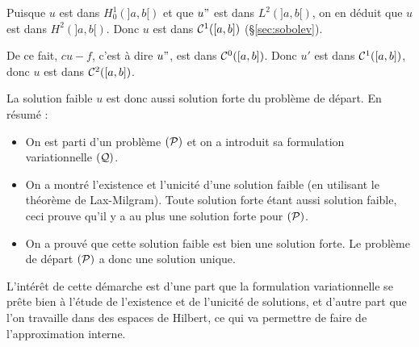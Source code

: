 Puisque $u$ est dans $H^1_0(]a,b[)$ et que $u"$ est dans $L^2(]a,b[)$, on en
déduit que  $u$ est dans $H^2(]a,b[)$. Donc $u$ est dans ${\cal C}^1([a,b])$
(\cf \S \ref{sec:sobolev}).

De ce fait, $cu-f$, c'est \`a dire $u"$, est dans ${\cal C}^0([a,b])$. Donc
$u'$ est dans ${\cal C}^1([a,b])$, donc $u$ est dans ${\cal C}^2([a,b])$.

La solution faible $u$ est donc aussi solution forte du problème de
départ.\saut
%
%
En résumé :
\begin{itemize}
\item On est parti d'un problème $({\cal P})$ et on a introduit sa
  formulation variationnelle $({\cal Q})$.
\item On a montré l'existence et l'unicité d'une solution faible (en
  utilisant le théorème de Lax-Milgram). Toute solution forte étant
  aussi solution faible, ceci prouve qu'il y a au plus une solution forte pour
  $({\cal P})$.
\item On a prouvé que cette solution faible est bien une solution forte. Le
  problème de départ $({\cal P})$ a donc une solution unique.  \saut
\end{itemize}
%
L'intérêt de cette démarche est d'une part que la formulation
variationnelle se prête bien \`a l'étude de l'existence et de l'unicité
de solutions, et d'autre part que l'on travaille dans des espaces de Hilbert,
ce qui va permettre de faire de l'approximation interne.
%
%
